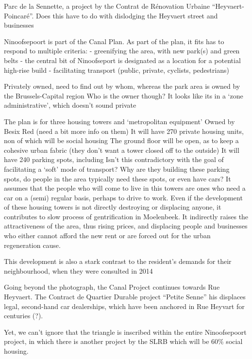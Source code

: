 \documentclass{article}
\begin{document}
Parc de la Sennette, a project by the Contrat de Rénovation Urbaine ``Heyvaert-Poincaré''. Does this have to do with dislodging the Heyvaert street and businesses

Ninoofsepoort is part of the Canal Plan. As part of the plan, it fits has to respond to multiple criteria:\cite{diagnosticNinove}
- greenifying the area, with new park(s) and green belts
- the central bit of Ninoofseport is designated as a location for a potential high-rise build
- facilitating transport (public, private, cyclists, pedestrians)

Privately owned, need to find out by whom, whereas the park area is owned by the Brussels-Capital region
Who is the owner though? It looks like its in a `zone administrative', which doesn't sound private

The plan is for three housing towers and `metropolitan equipment' 
Owned by Besix Red (need a bit more info on them)
It will have 270 private housing units, non of which will be social housing
The ground floor will be open, as to keep a cohesive urban fabric (they don't want a tower closed off to the outside)
It will have 240 parking spots, including 
Isn't this contradictory with the goal of facilitating a `soft' mode of transport? Why are they building these parking spots, do people in the area typically need these spots, or even have cars? It assumes that the people who will come to live in this towers are ones who need a car on a (semi) regular basis, perhaps to drive to work.
Even if the development of these housing towers is not directly destroying or displacing anyone, it contributes to slow process of gentrification in Moelenbeek. It indirectly raises the attractiveness of the area, thus rising prices, and displacing people and businesses who either cannot afford the new rent or are forced out for the urban regeneration cause. 

This development is also a stark contrast to the resident's demands for their neighbourhood, when they were consulted in 2014

Going beyond the photograph, the Canal Project continues towards Rue Heyvaert. The Contract de Quartier Durable project ``Petite Senne'' his displaces legal, second-hand car dealerships, which have been anchored in Rue Heyvart for centuries (?). 

Yet, we can't ignore that the triangle is inscribed within the entire Ninoofsepoort project, in which there is another project by the SLRB which will be 60\% social housing.
\end{document}
